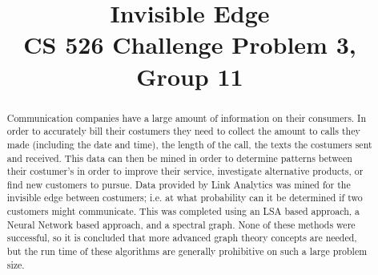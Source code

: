 \documentclass[conference]{IEEEtran}
\begin{document}
\title{Invisible Edge\\
CS 526 Challenge Problem 3, Group 11}

\author{
\and
{}
\and
{}
}


\maketitle
\IEEEpeerreviewmaketitle
\begin{abstract}
Communication companies have a large amount of information on their consumers.
In order to accurately bill their costumers they need to collect the amount to calls they made (including the date and time), the length of the call, the texts the costumers sent and received.
This data can then be mined in order to determine patterns between their costumer's in order to improve their service, investigate alternative products, or find new customers to pursue.
Data provided by Link Analytics was mined for the invisible edge between costumers; i.e. at what probability can it be determined if two customers might communicate.
This was completed using an LSA based approach, a Neural Network based approach, and a spectral graph.
None of these methods were successful, so it is concluded that more advanced graph theory concepts are needed, but the run time
of these algorithms are generally prohibitive on such a large problem size.
\end{abstract}






\end{document}
